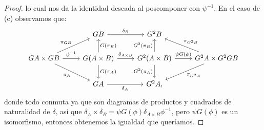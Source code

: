 \begin{proof}
  lo cual nos da la identidad deseada al poscomponer con $\psi^{-1}$. En el caso de (c) observamos que:
  \begin{equation*}
    \begin{tikzcd}
      {} & GB\ar{r}{\delta_B} & G^2B & {} \\
      GA\times GB\ar{ur}{\pi_{GB}}\ar{r}{\phi^{-1}}\ar[swap]{dr}{\pi_A} & G(A\times B)\ar[swap]{u}{G(\pi_B)}\ar{r}{\delta_{A\times B}}\ar{d}{G(\pi_A)}
        & G^2(A\times B)\ar{u}{G^2(\pi_B)}\ar{r}{\psi G(\phi)}\ar[swap]{d}{G^2(\pi_A)}
        & G^2A\times G^2GB\ar[swap]{ul}{\pi_{G^2B}}\ar{dl}{\pi_{G^2A}} \\
      & GA\ar[swap]{r}{\delta_A} & G^2A,
    \end{tikzcd}
  \end{equation*}
  donde todo conmuta ya que son diagramas de productos y cuadrados de naturalidad de $\delta$, así
  que $\delta_A\times\delta_B=\psi G(\phi)\delta_{A\times B}\phi^{-1}$, pero $\psi G(\phi)$ es un
  isomorfismo, entonces obtenemos la igualdad que queríamos.


\end{proof}
